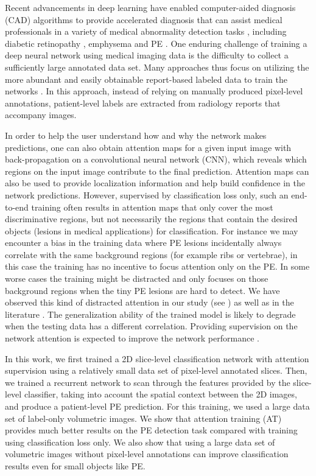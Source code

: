 \documentclass{midl} %
\begin{document}
Recent advancements in deep learning have enabled computer-aided diagnosis (CAD) algorithms to provide accelerated diagnosis that can assist medical professionals in a variety of medical abnormality detection tasks \cite{tajbakhsh2015computer,gondal2017weakly,braman2018disease,guan2018diagnose,Huang2019PENet, rajan2019pipe}, including diabetic retinopathy \cite{gondal2017weakly}, emphysema \cite{braman2018disease} and PE \cite{tajbakhsh2015computer, Huang2019PENet, rajan2019pipe}. One enduring challenge of training a deep neural network using medical imaging data is the difficulty to collect a sufficiently large annotated data set. Many approaches thus focus on utilizing the more abundant and easily obtainable report-based labeled data to train the networks \cite{gondal2017weakly, braman2018disease,guan2018diagnose}. In this approach, instead of relying on manually produced pixel-level annotations, patient-level labels are extracted from radiology reports that accompany images. 

In order to help the user understand how and why the network makes predictions, one can also obtain attention maps \cite{zhou2016learning,selvaraju2017grad} for a given input image with back-propagation on a convolutional neural network (CNN), which reveals which regions on the input image contribute to the final prediction. Attention maps can also be used to provide localization information and help build confidence in the network predictions. However, supervised by classification loss only, such an end-to-end training often results in attention maps that only cover the most discriminative regions, but not necessarily the regions that contain the desired objects (lesions in medical applications) for classification. For instance we may encounter a bias in the training data where PE lesions incidentally always correlate with the same background regions (for example ribs or vertebrae), in this case the training has no incentive to focus attention only on the PE. In some worse cases the training might be distracted and only focuses on those background regions when the tiny PE lesions are hard to detect. We have observed this kind of distracted attention in our study (see ) as well as in the literature \cite{Huang2019PENet}. The generalization ability of the trained model is likely to degrade when the testing data has a different correlation. Providing supervision on the network attention is expected to improve the network performance \cite{li2018tell}. 

In this work, we first trained a 2D slice-level classification network with attention supervision using a relatively small data set of pixel-level annotated slices. Then, we trained a recurrent network to scan through the features provided by the slice-level classifier, taking into account the spatial context between the 2D images, and produce a patient-level PE prediction. For this training, we used a large data set of label-only volumetric images. We show that attention training (AT) provides much better results on the PE detection task compared with training using classification loss only. We also show that using a large data set of volumetric images without pixel-level annotations can improve classification results even for small objects like PE. 
\end{document}
